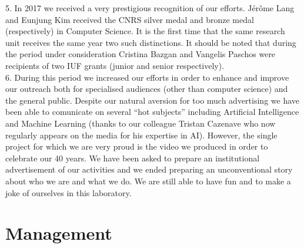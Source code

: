 5. In 2017 we received a very prestigious recognition of our efforts. Jérôme Lang and Eunjung Kim received the CNRS silver medal and bronze medal (respectively) in Computer Science. It is the first time that the same research unit receives the same year two such distinctions. It should be noted that during the period under consideration Cristina Bazgan and Vangelis Paschos were recipients of two IUF grants (junior and senior respectively). \\
6. During this period we increased our efforts in order to enhance and improve our outreach both for specialised audiences (other than computer science) and the general public. Despite our natural aversion for too much advertising we have been able to comunicate on several ``hot subjects'' including Artificial Intelligence and Machine Learning (thanks to our colleague Tristan Cazenave who now regularly appears on the media for his expertise in AI). However, the single project for which we are very proud is the video we produced in order to celebrate our 40 years. We have been asked to prepare an institutional advertisement of our activities and we ended preparing an unconventional story about who we are and what we do. We are still able to have fun and to make a joke of ourselves in this laboratory.

\section{Management}\label{Management}

